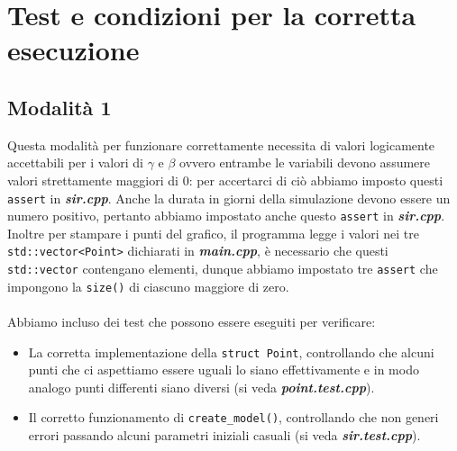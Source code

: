 \documentclass[a4paper,10 pt]{article}
\begin{document}
\section{Test e condizioni per la corretta esecuzione}
\subsection{Modalità 1}
Questa modalità per funzionare correttamente necessita di valori logicamente accettabili per i valori di $\gamma$ e $\beta$ ovvero entrambe le variabili devono assumere valori strettamente maggiori di 0: per accertarci di ciò abbiamo imposto questi \verb!assert! in \textbf{\textit{sir.cpp}}. Anche la durata in giorni della simulazione devono essere un numero positivo, pertanto abbiamo impostato anche questo \verb!assert! in \textbf{\textit{sir.cpp}}. Inoltre per stampare i punti del grafico, il programma legge i valori nei tre \verb!std::vector<Point>! dichiarati in \textbf{\textit{main.cpp}}, è necessario che questi  \verb!std::vector! contengano elementi, dunque abbiamo impostato tre  \verb!assert! che impongono la  \verb!size()! di ciascuno maggiore di zero.
\ \\
\ \\
Abbiamo incluso dei test che possono essere eseguiti per verificare:
\begin{itemize}
\item La corretta implementazione della \verb!struct Point!, controllando che alcuni punti che ci aspettiamo essere uguali lo siano effettivamente e in modo analogo punti differenti siano diversi (si veda  \textbf{\textit{point.test.cpp}}).
\item Il corretto funzionamento di \verb!create_model()!, controllando che non generi errori passando alcuni parametri iniziali casuali (si veda \textbf{\textit{sir.test.cpp}}).
 \end{itemize}
\end{document}
